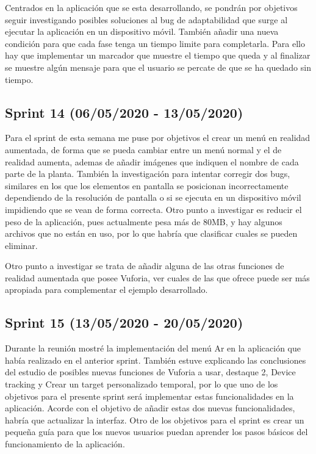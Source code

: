 Centrados en la aplicación que se esta desarrollando, se pondrán por objetivos seguir investigando posibles soluciones al bug de adaptabilidad que surge al ejecutar la aplicación en un dispositivo móvil. También añadir una nueva condición para que cada fase tenga un tiempo limite para completarla. Para ello hay que implementar un marcador que muestre el tiempo que queda y al finalizar se muestre algún mensaje para que el usuario se percate de que se ha quedado sin tiempo.

\subsection{Sprint 14 (06/05/2020 - 13/05/2020)}
Para el sprint de esta semana me puse por objetivos el crear un menú en realidad aumentada, de forma que se pueda cambiar entre un menú normal y el de realidad aumenta, ademas de añadir imágenes que indiquen el nombre de cada parte de la planta. También la investigación para intentar corregir dos bugs, similares en los que los elementos en pantalla se posicionan incorrectamente dependiendo de la resolución de pantalla o si se ejecuta en un dispositivo móvil impidiendo que se vean de forma correcta. 
Otro punto a investigar es reducir el peso de la aplicación, pues actualmente pesa más de 80MB, y hay algunos archivos que no están en uso, por lo que habría que clasificar cuales se pueden eliminar.

Otro punto a investigar se trata de añadir alguna de las otras funciones de realidad aumentada que posee Vuforia, ver cuales de las que ofrece puede ser más apropiada para complementar el ejemplo desarrollado.

\subsection{Sprint 15 (13/05/2020 - 20/05/2020)}
 Durante la reunión mostré la implementación del menú Ar en la aplicación que había realizado en el anterior sprint. También estuve explicando las conclusiones del estudio de posibles nuevas funciones de Vuforia a usar, destaque 2, Device tracking y Crear un target personalizado temporal, por lo que uno de los objetivos para el presente sprint será implementar estas funcionalidades en la aplicación. Acorde con el objetivo de añadir estas dos nuevas funcionalidades, habría que actualizar la interfaz. Otro de los objetivos para el sprint es crear un pequeña guía para que los nuevos usuarios puedan aprender los pasos básicos del funcionamiento de la aplicación.
 
